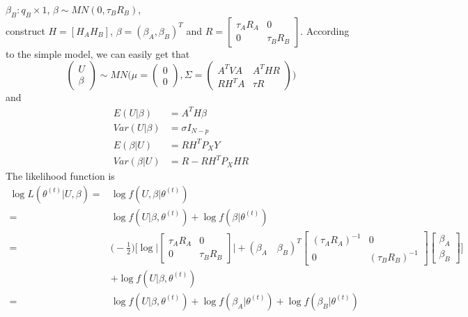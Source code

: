 \documentclass[12pt]{article}
\begin{document}
    $\beta_B:q_B\times 1$, $\beta\sim MN(0,\tau_B R_B)$, \\ 
    construct $H=[H_A H_B]$, $\beta=(\beta_A, \beta_B)^T$ and $R=\begin{bmatrix}\tau_A R_A&0\\0&\tau_B R_B \end{bmatrix} $.
    According to the simple model, we can easily get that 
    \begin{equation*}
    \begin{pmatrix}
    U\\
    \beta
    \end{pmatrix}
    \sim MN\Big( \mu=\begin{pmatrix}
    0\\
    0
    \end{pmatrix}
    ,\Sigma=\begin{pmatrix}
    A^TVA& A^THR\\
    RH^TA&\tau R
    \end{pmatrix}
    \Big)
    \end{equation*}
    and 
    \begin{align*}
        E(U|\beta)&=A^TH\beta\\
        Var(U|\beta)&=\sigma I_{N-p}\\ 
        E(\beta|U)&=RH^TP_XY\\
        Var(\beta|U)&= R-RH^TP_XHR
    \end{align*}
    The likelihood function is 
    \begin{align*}
        \log L(\theta^{(t)}|U,\beta)=&\log f(U,\beta|\theta^{(t)})\\
        =&\log f(U|\beta,\theta^{(t)})+ \log f(\beta|\theta^{(t)})\\
        =&\Big(-\frac{1}{2} \Big)\Big[\log\Big|\begin{bmatrix} \tau_AR_A&0\\0&\tau_BR_B \end{bmatrix} \Big|+(\beta_A\quad\beta_B)^T
        \begin{bmatrix}(\tau_AR_A)^{-1}&0\\0&(\tau_BR_B)^{-1}\end{bmatrix}\begin{bmatrix}\beta_A\\ \beta_B\end{bmatrix}           \Big]\\
        &+\log f(U|\beta,\theta^{(t)})\\
        =&\log f(U|\beta,\theta^{(t)})+ \log f(\beta_A|\theta^{(t)})+ \log f(\beta_B|\theta^{(t)})\\
    \end{align*}
\end{document}
